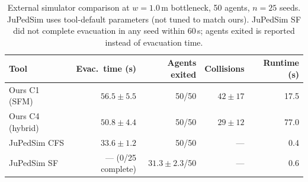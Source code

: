 \begin{table}[h]
\caption{External simulator comparison at $w=1.0$\,m bottleneck, 50 agents, $n=25$ seeds. JuPedSim uses tool-default parameters (not tuned to match ours). JuPedSim SF did not complete evacuation in any seed within 60\,s; agents exited is reported instead of evacuation time.}\label{tab:external}
\centering\scriptsize
\begin{tabular}{@{}lrrrr@{}}
\toprule
\textbf{Tool} & \textbf{Evac.\ time (s)} & \textbf{Agents exited} & \textbf{Collisions} & \textbf{Runtime (s)} \\
\midrule
Ours C1 (SFM) & $56.5 \pm 5.5$ & 50/50 & $42 \pm 17$ & 17.5 \\
Ours C4 (hybrid) & $50.8 \pm 4.4$ & 50/50 & $29 \pm 12$ & 77.0 \\
JuPedSim CFS & $33.6 \pm 1.2$ & 50/50 & --- & 0.4 \\
JuPedSim SF & --- (0/25 complete) & $31.3 \pm 2.3$/50 & --- & 0.6 \\
\bottomrule
\end{tabular}
\end{table}